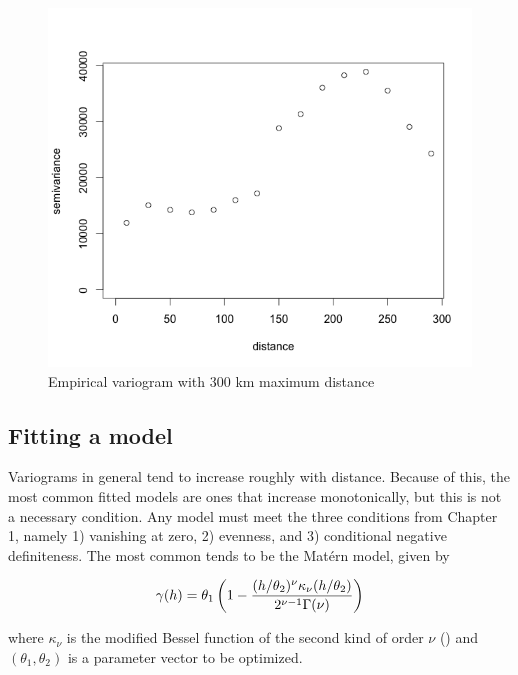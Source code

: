 \documentclass[12pt,twoside]{reedthesis}
\begin{document}
\begin{figure}[h]
	   
	       \centering
	  
	    \includegraphics[scale=0.6]{Variogram}
	
	     \caption{Empirical variogram with 300 km maximum distance}
	 \label{variogram}
	\end{figure}

\subsection{Fitting a model}

Variograms in general tend to increase roughly with distance. Because of this, the most common fitted models are ones that increase monotonically, but this is not a necessary condition. Any model must meet the three conditions from Chapter 1, namely 1) vanishing at zero, 2) evenness, and 3) conditional negative definiteness. The most common tends to be the Mat\'ern model, given by 

\begin{align*}
\gamma(h) = \theta_1\left (1-{{(h/\theta_2)^\nu\kappa_{\nu}(h/\theta_2)}\over{2^{\nu-1}\Gamma(\nu)}} \right )
\end{align*}

where $\kappa_\nu$ is the modified Bessel function of the second kind of order $\nu$ (\cite{gelfand:2010}) and $(\theta_1, \theta_2)$ is a parameter vector to be optimized. \\
\end{document}
